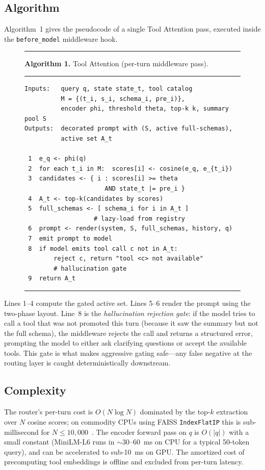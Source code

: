 \documentclass[11pt]{article}
\begin{document}
\subsection{Algorithm}

Algorithm~1 gives the pseudocode of a single Tool Attention pass, executed inside the \texttt{before\_model} middleware hook.

\begin{figure}[t]
\hrule\vspace{0.4em}
\noindent\textbf{Algorithm 1.} Tool Attention (per-turn middleware pass).
\vspace{0.2em}\hrule\vspace{0.4em}
\begin{verbatim}
Inputs:   query q, state state_t, tool catalog
          M = {(t_i, s_i, schema_i, pre_i)},
          encoder phi, threshold theta, top-k k, summary pool S
Outputs:  decorated prompt with (S, active full-schemas),
          active set A_t

 1  e_q <- phi(q)
 2  for each t_i in M:  scores[i] <- cosine(e_q, e_{t_i})
 3  candidates <- { i : scores[i] >= theta
                      AND state_t |= pre_i }
 4  A_t <- top-k(candidates by scores)
 5  full_schemas <- [ schema_i for i in A_t ]
                   # lazy-load from registry
 6  prompt <- render(system, S, full_schemas, history, q)
 7  emit prompt to model
 8  if model emits tool call c not in A_t:
        reject c, return "tool <c> not available"
        # hallucination gate
 9  return A_t
\end{verbatim}
\hrule
\end{figure}

Lines 1--4 compute the gated active set. Lines 5--6 render the prompt using the two-phase layout. Line~8 is the \emph{hallucination rejection gate}: if the model tries to call a tool that was not promoted this turn (because it saw the summary but not the full schema), the middleware rejects the call and returns a structured error, prompting the model to either ask clarifying questions or accept the available tools. This gate is what makes aggressive gating safe---any false negative at the routing layer is caught deterministically downstream.

\subsection{Complexity}

The router's per-turn cost is $O(N \log N)$ dominated by the top-$k$ extraction over $N$ cosine scores; on commodity CPUs using FAISS \texttt{IndexFlatIP} this is sub-millisecond for $N \le 10{,}000$~\citep{johnson2019faiss}. The encoder forward pass on $q$ is $O(\lvert q \rvert)$ with a small constant (MiniLM-L6 runs in ${\sim}30$--$60$~ms on CPU for a typical 50-token query), and can be accelerated to sub-10~ms on GPU. The amortized cost of precomputing tool embeddings is offline and excluded from per-turn latency.
\end{document}
